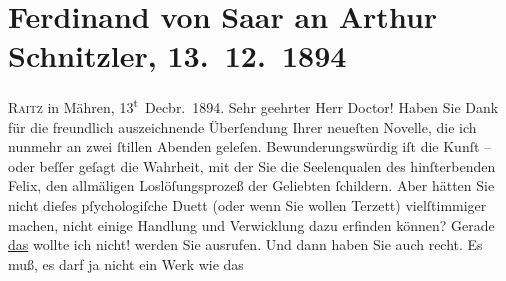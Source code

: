 

         
         \renewcommand{\erwaehntePersonen}{Personen: Ferdinand von Saar}
         \renewcommand{\erwaehnteOrte}{Orte: Rájec-Jestřebí, Wien}
         \renewcommand{\erwaehnteWerke}{Werke: Sterben. Novelle}
               \section[Ferdinand von Saar an Arthur Schnitzler, 13. 12. 1894]{ Ferdinand von Saar an Arthur Schnitzler, 13. 12. 1894}\nopagebreak{}\rehead{ }\begin{ledgroupsized}[t]{13cm}\normalsize\beginnumbering{} \toendnotes[C]{\smallbreak\pagebreak[2]} 
\toendnotes[C]{\smallbreak}\pstart
           \raggedleft{}{\pb}\textsc{Raitz} in Mähren, 13\textsuperscript{t} Decbr. 1894.\pend
           \pstart{}Sehr geehrter Herr Doctor!\pend\pstart
           Haben Sie Dank für die freundlich auszeichnende Überſendung Ihrer neueſten Novelle, die ich nunmehr an zwei ſtillen Abenden
               geleſen. Bewunderungswürdig iſt die Kunſt – oder beſſer geſagt die Wahrheit, mit der
               Sie die Seelenqualen des hinſterbenden Felix, den allmäligen Loslöſungsprozeß der Geliebten
               ſchildern. Aber hätten Sie nicht dieſes pſychologiſche Duett (oder wenn Sie wollen
               Terzett) vielſtimmiger machen, nicht einige Handlung und Verwicklung dazu erfinden
               können? Gerade \uline{das} wollte ich nicht! werden Sie
               ausrufen. Und dann haben Sie auch recht. Es muß, es darf ja nicht ein Werk wie das

\end{ledgroupsized}
